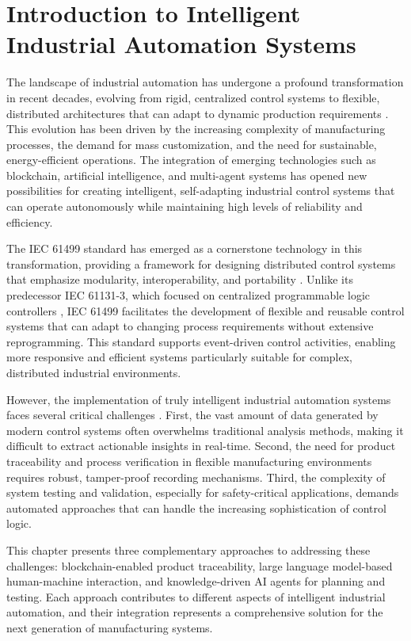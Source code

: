 
\section{Introduction to Intelligent Industrial Automation Systems}

The landscape of industrial automation has undergone a profound transformation in recent decades, evolving from rigid, centralized control systems to flexible, distributed architectures that can adapt to dynamic production requirements \cite{LEITAO2009979}. This evolution has been driven by the increasing complexity of manufacturing processes, the demand for mass customization, and the need for sustainable, energy-efficient operations. The integration of emerging technologies such as blockchain, artificial intelligence, and multi-agent systems has opened new possibilities for creating intelligent, self-adapting industrial control systems that can operate autonomously while maintaining high levels of reliability and efficiency.

The IEC 61499 standard has emerged as a cornerstone technology in this transformation, providing a framework for designing distributed control systems that emphasize modularity, interoperability, and portability \cite{vyatkin2009iec}. Unlike its predecessor IEC 61131-3, which focused on centralized programmable logic controllers \cite{tiegelkamp2010iec}, IEC 61499 facilitates the development of flexible and reusable control systems that can adapt to changing process requirements without extensive reprogramming. This standard supports event-driven control activities, enabling more responsive and efficient systems particularly suitable for complex, distributed industrial environments.

However, the implementation of truly intelligent industrial automation systems faces several critical challenges \cite{stojanovic2020challenges}. First, the vast amount of data generated by modern control systems often overwhelms traditional analysis methods, making it difficult to extract actionable insights in real-time. Second, the need for product traceability and process verification in flexible manufacturing environments requires robust, tamper-proof recording mechanisms. Third, the complexity of system testing and validation, especially for safety-critical applications, demands automated approaches that can handle the increasing sophistication of control logic.

This chapter presents three complementary approaches to addressing these challenges: blockchain-enabled product traceability, large language model-based human-machine interaction, and knowledge-driven AI agents for planning and testing. Each approach contributes to different aspects of intelligent industrial automation, and their integration represents a comprehensive solution for the next generation of manufacturing systems.


